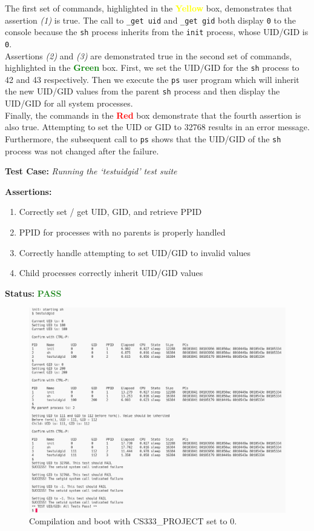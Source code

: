 \documentclass[11pt,letterpaper]{report}
\newcommand{\code}[1]{\colorbox{codegray}{\texttt{#1}}}
\begin{document}
{  The first set of commands, highlighted in the \textcolor{Yellow}{\textbf{Yellow}} box, 
  demonstrates that assertion \emph{(1)} is true. The call to \code{\_get uid} 
  and \code{\_get gid} both display \code{0} to the console because the \code{sh} process inherits from the
  \code{init} process, whose UID/GID is \code{0}. \\
  \indent Assertions \emph{(2)} and \emph{(3)} are demonstrated true in the second set of commands,
  highlighted in the \textcolor{Green}{\textbf{Green}} box. First, we set the UID/GID for 
  the \code{sh} process to 42 and 43 respectively. Then we execute the \code{ps} user program
  which will inherit the new UID/GID values from the parent \code{sh} process and then display
  the UID/GID for all system processes. \\
  \indent Finally, the commands in the \textcolor{Red}{\textbf{Red}} box demonstrate that the
  fourth assertion is also true. Attempting to set the UID or GID to 32768 results in an error
  message. Furthermore, the subsequent call to \code{ps} shows that the UID/GID of the \code{sh}
  process was not changed after the failure. 

  \noindent\textbf{Test Case:} \emph{Running the `testuidgid' test suite}
  
  \noindent\textbf{Assertions:}
  \begin{enumerate}[]
  \item Correctly set / get UID, GID, and retrieve PPID
  \item PPID for processes with no parents is properly handled
  \item Correctly handle attempting to set UID/GID to invalid values
  \item Child processes correctly inherit UID/GID values
  \end{enumerate}  
  
  \noindent\textbf{Status:} \textcolor{ForestGreen}{\textbf{PASS}}
  
  \begin{figure}[h!]
	\centering
	\includegraphics[width=1\linewidth]{testuidgid.png}
	\caption[img]{Compilation and boot with CS333\_PROJECT set to 0.}
	\label{fig:P1compileP0-1}
  \end{figure}

}
\end{document}
